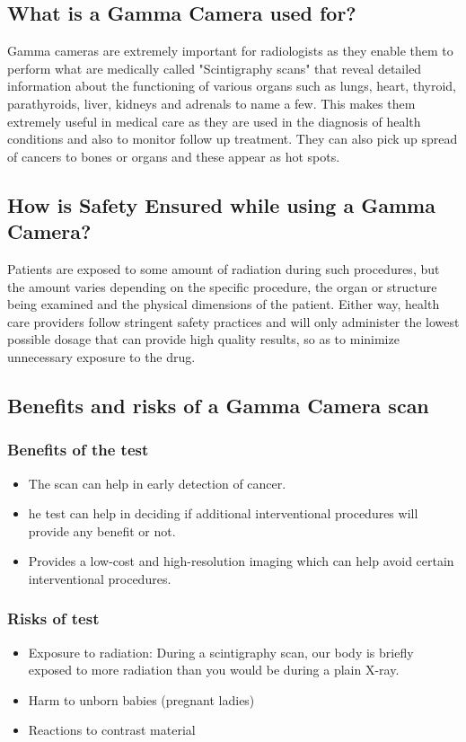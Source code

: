 \documentclass{article}
\begin{document}
\subsection{What is a Gamma Camera used for?}
Gamma cameras are extremely important for radiologists as they enable them to perform what are medically called "Scintigraphy scans" that reveal detailed information about the functioning of various organs such as lungs, heart, thyroid, parathyroids, liver, kidneys and adrenals to name a few. This makes them extremely useful in medical care as they are used in the diagnosis of health conditions and also to monitor follow up treatment. They can also pick up spread of cancers to bones or organs and these appear as hot spots.

\subsection{How is Safety Ensured while using a Gamma Camera?}
Patients are exposed to some amount of radiation during such procedures, but the amount varies depending on the specific procedure, the organ or structure being examined and the physical dimensions of the patient. Either way, health care providers follow stringent safety practices and will only administer the lowest possible dosage that can provide high quality results, so as to minimize unnecessary exposure to the drug.

\subsection{Benefits and risks of a Gamma Camera scan}
\subsubsection{Benefits of the test}
\begin{itemize}
\item The scan can help in early detection of cancer.
\item he test can help in deciding if additional interventional procedures will provide any benefit or not.
\item Provides a low-cost and high-resolution imaging which can help avoid certain interventional procedures.
\end{itemize}

\subsubsection{Risks of test}
\begin{itemize}
\item Exposure to radiation: During a scintigraphy scan,  our body is briefly exposed to more radiation than you would be during a plain X-ray.
\item Harm to unborn babies (pregnant ladies)
\item Reactions to contrast material
\end{itemize}
\pagebreak
\end{document}
